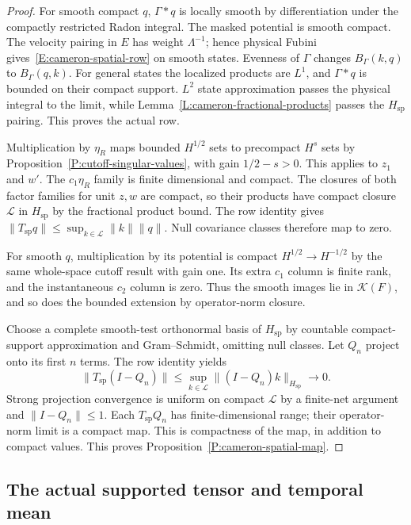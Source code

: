 \begin{proof}
  For smooth compact $q$, $\Gamma*q$ is locally smooth by
  differentiation under the compactly restricted Radon integral.
  The masked potential is smooth compact.
  The velocity pairing in $E$ has weight $\Lambda^{-1}$;
  hence physical Fubini gives~\eqref{E:cameron-spatial-row}
  on smooth states. Evenness of $\Gamma$ changes
  $B_\Gamma(k,q)$ to $B_\Gamma(q,k)$.
  For general states the localized products are $L^1$, and
  $\Gamma*q$ is bounded on their compact support.
  $L^2$ state approximation passes the physical integral to the
  limit, while Lemma~\ref{L:cameron-fractional-products} passes
  the $H_{\mathrm{sp}}$ pairing. This proves the actual row.

  Multiplication by $\eta_R$ maps bounded $H^{1/2}$ sets to
  precompact $H^s$ sets by Proposition~\ref{P:cutoff-singular-values},
  with gain $1/2-s>0$. This applies to $z_1$ and $w'$.
  The $c_1\eta_R$ family is finite dimensional and compact.
  The closures of both factor families for unit $z,w$ are compact,
  so their products have compact closure $\mathcal L$ in
  $H_{\mathrm{sp}}$ by the fractional product bound.
  The row identity gives
  $\|T_{\mathrm{sp}}q\|\le\sup_{k\in\mathcal L}\|k\|\|q\|$.
  Null covariance classes therefore map to zero.

  For smooth $q$, multiplication by its potential is compact
  $H^{1/2}\to H^{-1/2}$ by the same whole-space cutoff result
  with gain one. Its extra $c_1$ column is finite rank, and the
  instantaneous $c_2$ column is zero. Thus the smooth images
  lie in $\mathcal K(F)$, and so does the bounded extension by
  operator-norm closure.

  Choose a complete smooth-test orthonormal basis of $H_{\mathrm{sp}}$
  by countable compact-support approximation and Gram--Schmidt,
  omitting null classes. Let $Q_n$ project onto its first $n$ terms.
  The row identity yields
  \[
    \|T_{\mathrm{sp}}(I-Q_n)\|
    \le\sup_{k\in\mathcal L}\|(I-Q_n)k\|_{H_{\mathrm{sp}}}
    \longrightarrow0.
  \]
  Strong projection convergence is uniform on compact $\mathcal L$
  by a finite-net argument and $\|I-Q_n\|\le1$.
  Each $T_{\mathrm{sp}}Q_n$ has finite-dimensional range; their
  operator-norm limit is a compact map.
  This is compactness of the map, in addition to compact values.
  This proves Proposition~\ref{P:cameron-spatial-map}.
\end{proof}

\subsection{The actual supported tensor and temporal mean}

